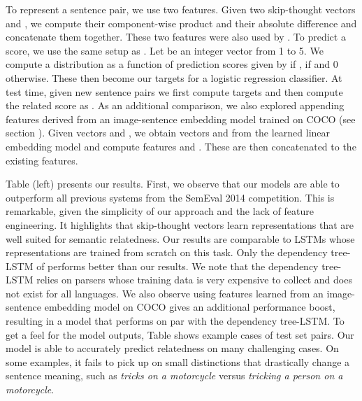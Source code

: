 \documentclass{article} \usepackage{nips15submit_e,times}
\begin{document}
To represent a sentence pair, we use two features. Given two skip-thought vectors  and , we compute their component-wise product  and their absolute difference  and concatenate them together. These two features were also used by \cite{tai2015improved}. To predict a score, we use the same setup as \cite{tai2015improved}. Let  be an integer vector from 1 to 5. We compute a distribution  as a function of prediction scores  given by  if ,  if  and 0 otherwise. These then become our targets for a logistic regression classifier. At test time, given new sentence pairs we first compute targets  and then compute the related score as . As an additional comparison, we also explored appending features derived from an image-sentence embedding model trained on COCO (see section ). Given vectors  and , we obtain vectors  and  from the learned linear embedding model and compute features  and . These are then concatenated to the existing features. 

Table  (left) presents our results. First, we observe that our models are able to outperform all previous systems from the SemEval 2014 competition. This is remarkable, given the simplicity of our approach and the lack of feature engineering. It highlights that skip-thought vectors learn representations that are well suited for semantic relatedness. Our results are comparable to LSTMs whose representations are trained from scratch on this task. Only the dependency tree-LSTM of \cite{tai2015improved} performs better than our results. We note that the dependency tree-LSTM relies on parsers whose training data is very expensive to collect and does not exist for all languages. We also observe using features learned from an image-sentence embedding model on COCO gives an additional performance boost, resulting in a model that performs on par with the dependency tree-LSTM. To get a feel for the model outputs, Table shows example cases of test set pairs. Our model is able to accurately predict relatedness on many challenging cases. On some examples, it fails to pick up on small distinctions that drastically change a sentence meaning, such as {\it tricks on a motorcycle} versus {\it tricking a person on a motorcycle}. 
\end{document}
